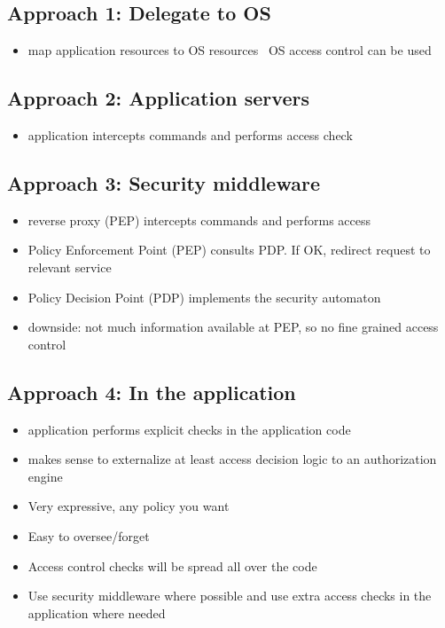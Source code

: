 \documentclass[12pt,titlepage,a4paper]{report}
\begin{document}
	\subsection{Approach 1: Delegate to OS}
	\begin{itemize}
		\item map application resources to OS resources \textrightarrow \, OS access control can be used
	\end{itemize}
	\subsection{Approach 2: Application servers}
	\begin{itemize}
		\item application intercepts commands and performs access check
	\end{itemize}
	\subsection{Approach 3: Security middleware}
	\begin{itemize}
		\item reverse proxy (PEP) intercepts commands and performs access
		\item Policy Enforcement Point (PEP)
			\subitem consults PDP. If OK, redirect request to relevant service
		\item Policy Decision Point (PDP)
			\subitem implements the security automaton
		\item downside: not much information available at PEP, so no fine grained access control
	\end{itemize}
	\subsection{Approach 4: In the application}
	\begin{itemize}
		\item application performs explicit checks in the application code
		\item makes sense to externalize at least access decision logic to an authorization engine
		\item Very expressive, any policy you want
		\item Easy to oversee/forget
		\item Access control checks will be spread all over the code
		\item[\textrightarrow] Use security middleware where possible and use extra access checks in the application where needed
	\end{itemize}
\end{document}
